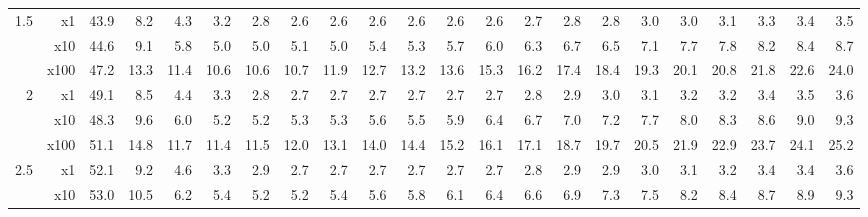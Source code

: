 \documentclass[12pt,preprint]{aastex}
\begin{document}
\begin{appendices}
\begin{table}
\begin{centering}
\begin{tabular}{r|r|rrrrrrrrrrrrrrrrrrrr}
        \hline
             1.5 &       x1 &       43.9 &        8.2 &        4.3 &        3.2 &        2.8 &        2.6 &        2.6 &        2.6 &        2.6 &        2.6 &        2.6 &        2.7 &        2.8 &        2.8 &        3.0 &        3.0 &        3.1 &        3.3 &        3.4 &        3.5 \\
                 &      x10 &       44.6 &        9.1 &        5.8 &        5.0 &        5.0 &        5.1 &        5.0 &        5.4 &        5.3 &        5.7 &        6.0 &        6.3 &        6.7 &        6.5 &        7.1 &        7.7 &        7.8 &        8.2 &        8.4 &        8.7 \\
                 &     x100 &       47.2 &       13.3 &       11.4 &       10.6 &       10.6 &       10.7 &       11.9 &       12.7 &       13.2 &       13.6 &       15.3 &       16.2 &       17.4 &       18.4 &       19.3 &       20.1 &       20.8 &       21.8 &       22.6 &       24.0 \\
               2 &       x1 &       49.1 &        8.5 &        4.4 &        3.3 &        2.8 &        2.7 &        2.7 &        2.7 &        2.7 &        2.7 &        2.7 &        2.8 &        2.9 &        3.0 &        3.1 &        3.2 &        3.2 &        3.4 &        3.5 &        3.6 \\
                 &      x10 &       48.3 &        9.6 &        6.0 &        5.2 &        5.2 &        5.3 &        5.3 &        5.6 &        5.5 &        5.9 &        6.4 &        6.7 &        7.0 &        7.2 &        7.7 &        8.0 &        8.3 &        8.6 &        9.0 &        9.3 \\
                 &     x100 &       51.1 &       14.8 &       11.7 &       11.4 &       11.5 &       12.0 &       13.1 &       14.0 &       14.4 &       15.2 &       16.1 &       17.1 &       18.7 &       19.7 &       20.5 &       21.9 &       22.9 &       23.7 &       24.1 &       25.2 \\
             2.5 &       x1 &       52.1 &        9.2 &        4.6 &        3.3 &        2.9 &        2.7 &        2.7 &        2.7 &        2.7 &        2.7 &        2.7 &        2.8 &        2.9 &        2.9 &        3.0 &        3.1 &        3.2 &        3.4 &        3.4 &        3.6 \\
                 &      x10 &       53.0 &       10.5 &        6.2 &        5.4 &        5.2 &        5.2 &        5.4 &        5.6 &        5.8 &        6.1 &        6.4 &        6.6 &        6.9 &        7.3 &        7.5 &        8.2 &        8.4 &        8.7 &        8.9 &        9.3 \\

\end{tabular}
\end{centering}
\end{table}
\end{appendices}
\end{document}
